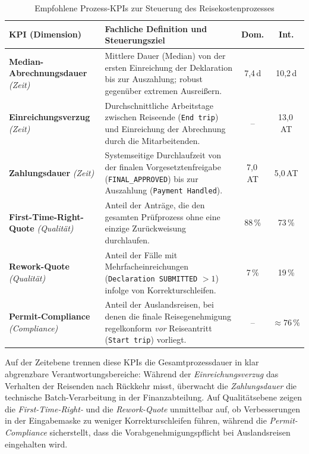 \begin{table}[htbp]
\centering
\caption{Empfohlene Prozess-KPIs zur Steuerung des Reisekostenprozesses}
\label{tab:kpis}
\footnotesize
\renewcommand{\arraystretch}{1.2}
\begin{tabularx}{\textwidth}{@{}p{3.2cm} X c c@{}}
\toprule
\textbf{KPI (Dimension)} & \textbf{Fachliche Definition und Steuerungsziel} & \textbf{Dom.} & \textbf{Int.} \\
\midrule
\textbf{Median-Abrechnungsdauer} \textit{(Zeit)} &
Mittlere Dauer (Median) von der ersten Einreichung der Deklaration bis zur Auszahlung; robust gegenüber extremen Ausreißern. &
7,4\,d & 10,2\,d \\
\textbf{Einreichungsverzug} \textit{(Zeit)} &
Durchschnittliche Arbeitstage zwischen Reiseende (\texttt{End trip}) und Einreichung der Abrechnung durch die Mitarbeitenden. &
-- & 13,0\,AT \\
\textbf{Zahlungsdauer} \textit{(Zeit)} &
Systemseitige Durchlaufzeit von der finalen Vorgesetztenfreigabe (\texttt{FINAL\_APPROVED}) bis zur Auszahlung (\texttt{Payment Handled}). &
7,0\,AT & 5,0\,AT \\
\textbf{First-Time-Right-Quote} \textit{(Qualität)} &
Anteil der Anträge, die den gesamten Prüfprozess ohne eine einzige Zurückweisung durchlaufen. &
88\,\% & 73\,\% \\
\textbf{Rework-Quote} \textit{(Qualität)} &
Anteil der Fälle mit Mehrfacheinreichungen (\texttt{Declaration SUBMITTED} $> 1$) infolge von Korrekturschleifen. &
7\,\% & 19\,\% \\
\textbf{Permit-Compliance} \textit{(Compliance)} &
Anteil der Auslandsreisen, bei denen die finale Reisegenehmigung regelkonform \emph{vor} Reiseantritt (\texttt{Start trip}) vorliegt. &
-- & $\approx 76\,\%$ \\
\bottomrule
\end{tabularx}
\end{table}

Auf der Zeitebene trennen diese KPIs die Gesamtprozessdauer in klar abgrenzbare Verantwortungsbereiche: Während der \emph{Einreichungsverzug} das Verhalten der Reisenden nach Rückkehr misst, überwacht die \emph{Zahlungsdauer} die technische Batch-Verarbeitung in der Finanzabteilung. Auf Qualitätsebene zeigen die \emph{First-Time-Right-} und die \emph{Rework-Quote} unmittelbar auf, ob Verbesserungen in der Eingabemaske zu weniger Korrekturschleifen führen, während die \emph{Permit-Compliance} sicherstellt, dass die Vorabgenehmigungspflicht bei Auslandsreisen eingehalten wird.
